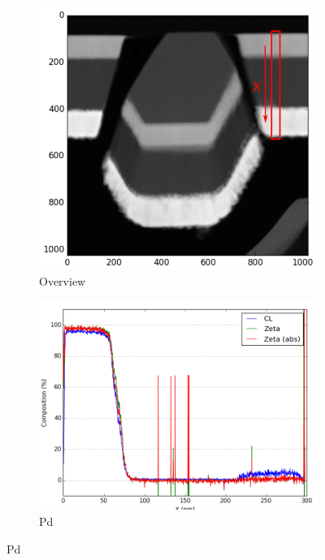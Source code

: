 \begin{figure}
	\begin{subfigure}{.5\textwidth}
		\includegraphics[width=\linewidth]{fig/q/2_overview}
		\caption{Overview}
		\label{fig:zeta_area2_overview}
	\end{subfigure}%
\hfill
	\begin{subfigure}{.5\textwidth}
		\centering
		\includegraphics[width=\linewidth]{fig/q-new/oldzetas_Sb_Pd_La}
		\caption{Pd}
		\label{fig:zeta_area2_pd}
	\end{subfigure}

\end{figure}
